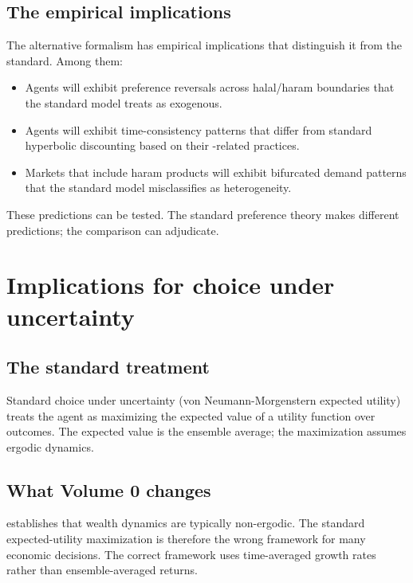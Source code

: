 \subsection{The empirical implications}

The alternative formalism has empirical implications that
distinguish it from the standard. Among them:

\begin{itemize}[leftmargin=2em]
    \item Agents will exhibit preference reversals across
    halal/haram boundaries that the standard model treats as
    exogenous.
    \item Agents will exhibit time-consistency patterns that
    differ from standard hyperbolic discounting based on their
    -related practices.
    \item Markets that include haram products will exhibit
    bifurcated demand patterns that the standard model
    misclassifies as heterogeneity.
\end{itemize}

These predictions can be tested. The standard preference theory
makes different predictions; the comparison can adjudicate.

\section{Implications for choice under uncertainty}
\label{sec:to-vol1-choice}

\subsection{The standard treatment}

Standard choice under uncertainty (von Neumann-Morgenstern
expected utility) treats the agent as maximizing the expected
value of a utility function over outcomes. The expected value is
the ensemble average; the maximization assumes ergodic dynamics.

\subsection{What Volume 0 changes}

 establishes that wealth dynamics are
typically non-ergodic. The standard expected-utility maximization
is therefore the wrong framework for many economic decisions. The
correct framework uses time-averaged growth rates rather than
ensemble-averaged returns.

